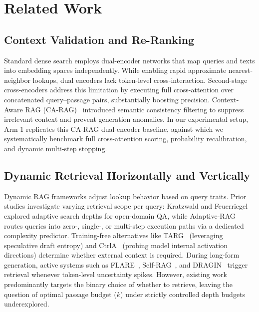 \documentclass{article}
\begin{document}
\section{Related Work}
\label{sec:related}

\subsection{Context Validation and Re-Ranking}
Standard dense search employs dual-encoder networks that map queries and texts into embedding spaces independently. While enabling rapid approximate nearest-neighbor lookups, dual encoders lack token-level cross-interaction. Second-stage cross-encoders address this limitation by executing full cross-attention over concatenated query--passage pairs, substantially boosting precision. Context-Aware RAG (CA-RAG)~\cite{collini2025carag} introduced semantic consistency filtering to suppress irrelevant context and prevent generation anomalies. In our experimental setup, Arm 1 replicates this CA-RAG dual-encoder baseline, against which we systematically benchmark full cross-attention scoring, probability recalibration, and dynamic multi-step stopping.

\subsection{Dynamic Retrieval Horizontally and Vertically}
Dynamic RAG frameworks adjust lookup behavior based on query traits. Prior studies investigate varying retrieval scope per query: Kratzwald and Feuerriegel~\cite{kratzwald2018adaptive} explored adaptive search depths for open-domain QA, while Adaptive-RAG~\cite{jeong2024adaptiverag} routes queries into zero-, single-, or multi-step execution paths via a dedicated complexity predictor. Training-free alternatives like TARG~\cite{wang2024targ} (leveraging speculative draft entropy) and CtrlA~\cite{liu2024ctrla} (probing model internal activation directions) determine whether external context is required. During long-form generation, active systems such as FLARE~\cite{jiang2023flare}, Self-RAG~\cite{asai2024selfrag}, and DRAGIN~\cite{su2024dragin} trigger retrieval whenever token-level uncertainty spikes. However, existing work predominantly targets the binary choice of whether to retrieve, leaving the question of optimal passage budget ($k$) under strictly controlled depth budgets underexplored.
\end{document}
